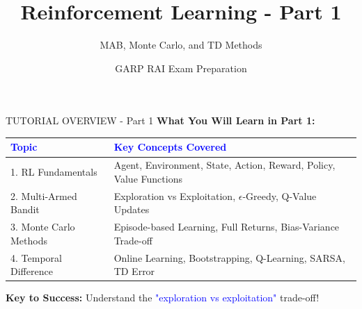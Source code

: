 \documentclass[8pt]{beamer}
\title{Reinforcement Learning - Part 1}
\subtitle{MAB, Monte Carlo, and TD Methods}
\author{GARP RAI Exam Preparation}
\date{}
\begin{document}
	
	\begin{frame}
		\titlepage
	\end{frame}
	
	
	\begin{frame}{TUTORIAL OVERVIEW - Part 1}
		\fontsize{7}{8}\selectfont
		\textbf{What You Will Learn in Part 1:}
		
		\vspace{0.2cm}
		\begin{tabular}{|p{2.5cm}|p{5.5cm}|}
			\hline
			\textcolor{blue}{Topic} & \textcolor{blue}{Key Concepts Covered} \\
			\hline
			1. RL Fundamentals & Agent, Environment, State, Action, Reward, Policy, Value Functions \\
			\hline
			2. Multi-Armed Bandit & Exploration vs Exploitation, $\epsilon$-Greedy, Q-Value Updates \\
			\hline
			3. Monte Carlo Methods & Episode-based Learning, Full Returns, Bias-Variance Trade-off \\
			\hline
			4. Temporal Difference & Online Learning, Bootstrapping, Q-Learning, SARSA, TD Error \\
			\hline
		\end{tabular}
		
		\vspace{0.2cm}
		\textbf{Key to Success:} Understand the \textcolor{blue}{"exploration vs exploitation"} trade-off!
	\end{frame}
	
\end{document}
